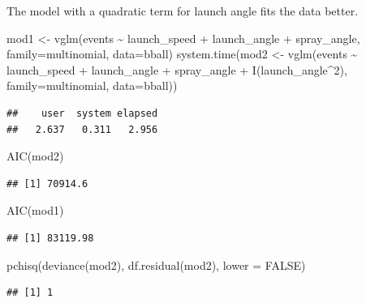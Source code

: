 \documentclass[
  ignorenonframetext,
]{beamer}
\newenvironment{Shaded}{\begin{snugshade}}{\end{snugshade}}
\newcommand{\AttributeTok}[1]{\textcolor[rgb]{0.77,0.63,0.00}{#1}}
\newcommand{\ConstantTok}[1]{\textcolor[rgb]{0.00,0.00,0.00}{#1}}
\newcommand{\DecValTok}[1]{\textcolor[rgb]{0.00,0.00,0.81}{#1}}
\newcommand{\FunctionTok}[1]{\textcolor[rgb]{0.00,0.00,0.00}{#1}}
\newcommand{\NormalTok}[1]{#1}
\newcommand{\OtherTok}[1]{\textcolor[rgb]{0.56,0.35,0.01}{#1}}
\newcommand{\SpecialCharTok}[1]{\textcolor[rgb]{0.00,0.00,0.00}{#1}}
\begin{document}
\begin{frame}[fragile]{}
\protect\hypertarget{section-8}{}
The model with a quadratic term for launch angle fits the data better.

\vspace{12pt}
\tiny

\begin{Shaded}
\begin{Highlighting}[]
\NormalTok{mod1 }\OtherTok{\textless{}{-}} \FunctionTok{vglm}\NormalTok{(events }\SpecialCharTok{\textasciitilde{}}\NormalTok{ launch\_speed }\SpecialCharTok{+}\NormalTok{ launch\_angle }\SpecialCharTok{+}\NormalTok{ spray\_angle, }
             \AttributeTok{family=}\NormalTok{multinomial, }\AttributeTok{data=}\NormalTok{bball)}
\FunctionTok{system.time}\NormalTok{(mod2 }\OtherTok{\textless{}{-}} \FunctionTok{vglm}\NormalTok{(events }\SpecialCharTok{\textasciitilde{}}\NormalTok{ launch\_speed }\SpecialCharTok{+}\NormalTok{ launch\_angle }\SpecialCharTok{+}\NormalTok{ spray\_angle }\SpecialCharTok{+} 
               \FunctionTok{I}\NormalTok{(launch\_angle}\SpecialCharTok{\^{}}\DecValTok{2}\NormalTok{), }
             \AttributeTok{family=}\NormalTok{multinomial, }\AttributeTok{data=}\NormalTok{bball))}
\end{Highlighting}
\end{Shaded}

\begin{verbatim}
##    user  system elapsed 
##   2.637   0.311   2.956
\end{verbatim}

\begin{Shaded}
\begin{Highlighting}[]
\FunctionTok{AIC}\NormalTok{(mod2) }
\end{Highlighting}
\end{Shaded}

\begin{verbatim}
## [1] 70914.6
\end{verbatim}

\begin{Shaded}
\begin{Highlighting}[]
\FunctionTok{AIC}\NormalTok{(mod1)}
\end{Highlighting}
\end{Shaded}

\begin{verbatim}
## [1] 83119.98
\end{verbatim}

\begin{Shaded}
\begin{Highlighting}[]
\FunctionTok{pchisq}\NormalTok{(}\FunctionTok{deviance}\NormalTok{(mod2), }\FunctionTok{df.residual}\NormalTok{(mod2), }\AttributeTok{lower =} \ConstantTok{FALSE}\NormalTok{)}
\end{Highlighting}
\end{Shaded}

\begin{verbatim}
## [1] 1
\end{verbatim}
\end{frame}
\end{document}
